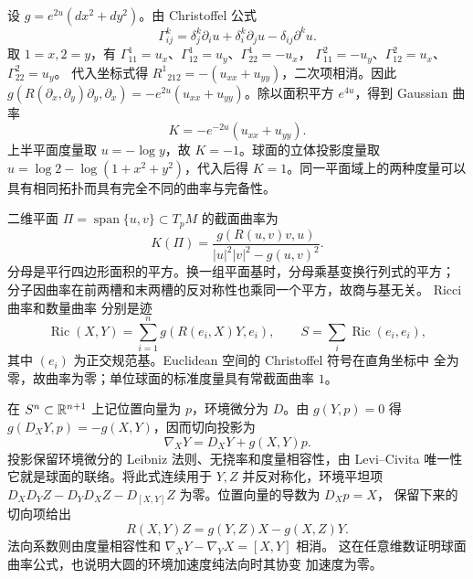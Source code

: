 \begin{example}[二维共形度量]
设 $g=e^{2u}(dx^2+dy^2)$。由 Christoffel 公式
\[
 \Gamma^k_{ij}=\delta^k_j\partial_i u+\delta^k_i\partial_j u
 -\delta_{ij}\partial^ku.
\]
取 $1=x,2=y$，有
$\Gamma^1_{11}=u_x$、$\Gamma^1_{12}=u_y$、$\Gamma^1_{22}=-u_x$，
$\Gamma^2_{11}=-u_y$、$\Gamma^2_{12}=u_x$、$\Gamma^2_{22}=u_y$。
代入坐标式得 $R^1{}_{212}=-(u_{xx}+u_{yy})$，二次项相消。因此
$g(R(\partial_x,\partial_y)\partial_y,\partial_x)
=-e^{2u}(u_{xx}+u_{yy})$。除以面积平方 $e^{4u}$，得到 Gaussian 曲率
\begin{equation}\label{eq:conformal-gaussian-curvature}
 K=-e^{-2u}(u_{xx}+u_{yy}).
\end{equation}
上半平面度量取 $u=-\log y$，故 $K=-1$。球面的立体投影度量取
$u=\log2-\log(1+x^2+y^2)$，代入后得 $K=1$。同一平面域上的两种度量可以
具有相同拓扑而具有完全不同的曲率与完备性。
\end{example}

二维平面 $\Pi=\operatorname{span}\{u,v\}\subset T_pM$ 的截面曲率为
\[
 K(\Pi)=\frac{g(R(u,v)v,u)}{|u|^2|v|^2-g(u,v)^2}.
\]
分母是平行四边形面积的平方。换一组平面基时，分母乘基变换行列式的平方；
分子因曲率在前两槽和末两槽的反对称性也乘同一个平方，故商与基无关。
Ricci 曲率和数量曲率
分别是迹
\[
 \operatorname{Ric}(X,Y)=\sum_{i=1}^ng(R(e_i,X)Y,e_i),
 \qquad S=\sum_i\operatorname{Ric}(e_i,e_i),
\]
其中 $(e_i)$ 为正交规范基。Euclidean 空间的 Christoffel 符号在直角坐标中
全为零，故曲率为零；单位球面的标准度量具有常截面曲率 $1$。

\begin{example}[球面的联络和曲率]\label{ex:sphere-connection-curvature}
在 $S^n\subset\mathbb{R}^{n+1}$ 上记位置向量为 $p$，环境微分为 $D$。由
$g(Y,p)=0$ 得 $g(D_XY,p)=-g(X,Y)$，因而切向投影为
\[
 \nabla_XY=D_XY+g(X,Y)p.
\]
投影保留环境微分的 Leibniz 法则、无挠率和度量相容性，由 Levi--Civita
唯一性它就是球面的联络。将此式连续用于 $Y,Z$ 并反对称化，环境平坦项
$D_XD_YZ-D_YD_XZ-D_{[X,Y]}Z$ 为零。位置向量的导数为 $D_Xp=X$，
保留下来的切向项给出
\[
 R(X,Y)Z=g(Y,Z)X-g(X,Z)Y.
\]
法向系数则由度量相容性和 $\nabla_XY-\nabla_YX=[X,Y]$ 相消。
这在任意维数证明球面曲率公式，也说明大圆的环境加速度纯法向时其协变
加速度为零。
\end{example}

